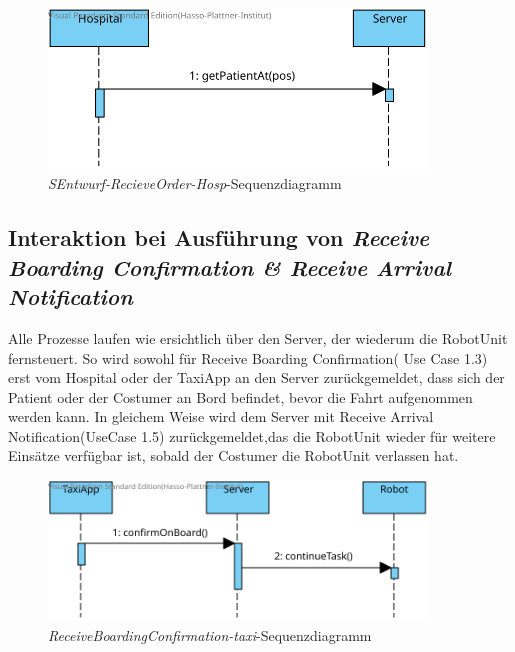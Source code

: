\begin{figure}[H]
	\centering
	\includegraphics[width=0.9\textwidth]{img/2-Entwurf-RecieveOrder-Hosp}
	\caption{\emph{SEntwurf-RecieveOrder-Hosp}-Sequenzdiagramm}
	\label{SequenzDiagrammInteraktion}
\end{figure}



\subsection*{Interaktion bei Ausführung von \emph{Receive Boarding Confirmation \& Receive Arrival Notification}}

Alle Prozesse laufen wie ersichtlich über den Server, der wiederum die RobotUnit fernsteuert. 
So wird sowohl für Receive Boarding Confirmation( Use Case 1.3) erst vom Hospital oder der TaxiApp an den Server zurückgemeldet, dass sich der Patient oder der Costumer an Bord befindet, bevor die Fahrt aufgenommen werden kann. 
In gleichem Weise wird dem Server mit Receive Arrival Notification(UseCase 1.5) zurückgemeldet,das die RobotUnit wieder für weitere Einsätze verfügbar ist, sobald der Costumer die RobotUnit verlassen hat.  \\

\begin{figure}[H]
	\centering
	\includegraphics[width=0.9\textwidth]{img/2-Entwurf-ReceiveBoardingConfirmation-taxi}
	\caption{\emph{ReceiveBoardingConfirmation-taxi}-Sequenzdiagramm}
	\label{SequenzDiagrammInteraktion}
\end{figure}

